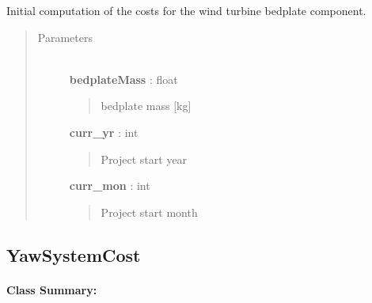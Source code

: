 \documentclass[letterpaper,10pt,openany,oneside]{sphinxmanual}
\begin{document}
\begin{fulllineitems}
\label{documentation:turbine_costSE.src.nacelle_costsSE.BedplateCost}
Initial computation of the costs for the wind turbine bedplate component.
\begin{quote}\begin{description}
\item[{Parameters }] \leavevmode\\
\textbf{bedplateMass} : float
\begin{quote}

bedplate mass {[}kg{]}
\end{quote}

\textbf{curr\_yr} : int
\begin{quote}

Project start year
\end{quote}

\textbf{curr\_mon} : int
\begin{quote}

Project start month
\end{quote}

\end{description}\end{quote}

\end{fulllineitems}



\subsection{YawSystemCost}
\label{documentation:yawsystemcost}\label{documentation:yawsystemcost-class-label}\paragraph{Class Summary:}
\end{document}

